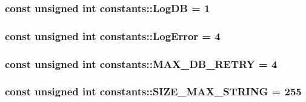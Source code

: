 \subsubsection[{Log\+D\+B}]{\setlength{\rightskip}{0pt plus 5cm}const unsigned int constants\+::\+Log\+D\+B = 1}\label{namespaceconstants_a90387be767c7d3ee7855aad5ae30424d}
\hypertarget{namespaceconstants_a37912655c5c028aaac3f43c328cac5a9}{}
\subsubsection[{Log\+Error}]{\setlength{\rightskip}{0pt plus 5cm}const unsigned int constants\+::\+Log\+Error = 4}\label{namespaceconstants_a37912655c5c028aaac3f43c328cac5a9}
\hypertarget{namespaceconstants_aeb74a174c09b3270cbbe13cd7096bdc4}{}
\subsubsection[{M\+A\+X\+\_\+\+D\+B\+\_\+\+R\+E\+T\+R\+Y}]{\setlength{\rightskip}{0pt plus 5cm}const unsigned int constants\+::\+M\+A\+X\+\_\+\+D\+B\+\_\+\+R\+E\+T\+R\+Y = 4}\label{namespaceconstants_aeb74a174c09b3270cbbe13cd7096bdc4}
\hypertarget{namespaceconstants_adcd439ae5ec9438dd68ae97ab9197b7d}{}
\subsubsection[{S\+I\+Z\+E\+\_\+\+M\+A\+X\+\_\+\+S\+T\+R\+I\+N\+G}]{\setlength{\rightskip}{0pt plus 5cm}const unsigned int constants\+::\+S\+I\+Z\+E\+\_\+\+M\+A\+X\+\_\+\+S\+T\+R\+I\+N\+G = 255}\label{namespaceconstants_adcd439ae5ec9438dd68ae97ab9197b7d}
